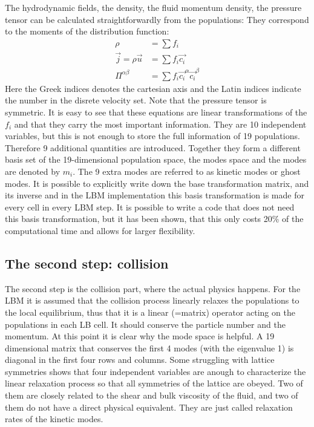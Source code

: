 The hydrodynamic fields, the density, 
the fluid momentum density,
the pressure tensor can be calculated straightforwardly from
the populations: They correspond to the moments
of the distribution function: 
\begin{align}
  \rho &= \sum f_i \\
  \vec{j} = \rho \vec{u} &= \sum f_i \vec{c_i} \\
  \Pi^{\alpha \beta} &= \sum f_i \vec{c_i}^{\alpha}\vec{c_i}^{\beta} 
  \label{eq:fields}
\end{align}
Here the Greek indices denotes the cartesian axis and the
Latin indices indicate the number in the disrete velocity set.
Note that the pressure tensor is symmetric.
It is easy to see that these equations are linear transformations
of the $f_i$ and that they carry the most important information. They
are 10 independent variables, but this is not enough to store the
full information of 19 populations. Therefore 9 additional quantities
are introduced. Together they form a different basis set of the
19-dimensional population space, the modes space and the modes are denoted by 
$m_i$. The 9 extra modes are referred to as kinetic modes or
ghost modes. It is possible to explicitly write down the 
base transformation matrix, and its inverse and in the \ES{}
LBM implementation this basis transformation is made for every
cell in every LBM step. It is possible to write a code that does not
need this basis transformation, but it has been shown, that this
only costs 20\% of the computational time and allows for 
larger flexibility.

\subsection*{The second step: collision}
The second step is the collision part, where
the actual physics happens. For the LBM it is assumed that
the collision process linearly relaxes the populations to the local
equilibrium, thus that it is a linear (=matrix) operator 
acting on the populations in each LB cell. It should conserve 
the particle number and the momentum. At this point it is clear
why the mode space is helpful. A 19 dimensional matrix that
conserves the first 4 modes (with the eigenvalue 1) is diagonal in the
first four rows and columns.
Some struggling with lattice symmetries shows that four independent
variables are anough to characterize the linear relaxation
process so that all symmetries of the lattice are obeyed. 
Two of them are closely related to 
the shear and bulk viscosity of the fluid, and two of them
do not have a direct physical equivalent. They are just called
relaxation rates of the kinetic modes.


